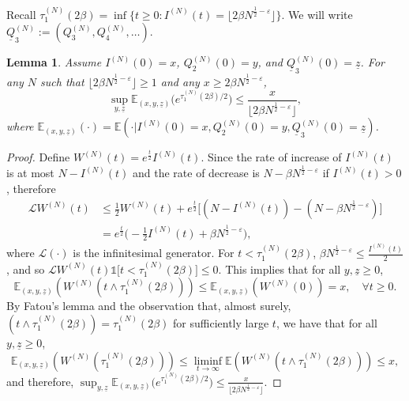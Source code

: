 \documentclass[11pt, reqno]{article}
\newtheorem{lemma}[theorem]{Lemma}
\numberwithin{equation}{section}
\numberwithin{theorem}{section}
\begin{document}
Recall $\tau^{(N)}_1(2\beta)=\inf \{t\geq 0: I^{(N)}(t)= \lfloor 2\beta N^{\frac{1}{2}-\varepsilon}\rfloor\}$. We will write $\underline{Q}^{(N)}_3 := (Q_3^{(N)}, Q_4^{(N)}, \dots)$.

\begin{lemma}\label{lem:LEMMA-9}
Assume $I^{(N)}(0)=x$, $Q^{(N)}_2(0)=y$, and $\underline{Q}^{(N)}_3(0)=\underline{z}$. For any $N$ such that $\lfloor 2\beta N^{\frac{1}{2}-\varepsilon}\rfloor \ge 1$ and any $x\geq 2\beta N^{\frac{1}{2}-\varepsilon}$,
\begin{equation*}
    \sup_{y,\underline{z}}\mathbb{E}_{(x,y,\underline{z})}\big(e^{\tau^{(N)}_1(2\beta)/2}\big)\leq \frac{x}{\lfloor 2\beta N^{\frac{1}{2}-\varepsilon}\rfloor},
\end{equation*}
where $\mathbb{E}_{(x,y,\underline{z})}(\cdot)=\mathbb{E}(\cdot|I^{(N)}(0)=x,Q^{(N)}_2(0)=y,\underline{Q}^{(N)}_3(0)=\underline{z})$.
\end{lemma}
\begin{proof}
Define $W^{(N)}(t)=e^{\frac{t}{2}}I^{(N)}(t)$. 
Since the rate of increase of $I^{(N)}(t)$ is at most $N-I^{(N)}(t)$ and the rate of decrease is $N-\beta N^{\frac{1}{2}-\varepsilon}$ if $I^{(N)}(t)>0$, therefore
\begin{align*}
    \mathcal{L}W^{(N)}(t)&\leq \frac{1}{2}W^{(N)}(t)+e^{\frac{t}{2}}\big[(N-I^{(N)}(t))-(N-\beta N^{\frac{1}{2}-\varepsilon})\big]\\
    &=e^{\frac{t}{2}}\big(-\frac{1}{2} I^{(N)}(t)+\beta N^{\frac{1}{2}-\varepsilon}\big),
\end{align*}
where $\mathcal{L}(\cdot)$ is the infinitesimal generator.
For $t < \tau^{(N)}_1(2\beta)$, $\beta N^{\frac{1}{2}-\varepsilon}\leq \frac{I^{(N)}(t)}{2}$, and so $\mathcal{L}W^{(N)}(t)\mathds{1}\big[t < \tau^{(N)}_1(2\beta)\big]\leq 0.$
This implies that for all $y,\underline{z}\geq0$,
\begin{equation*}
\mathbb{E}_{(x,y,\underline{z})}(W^{(N)}(t\wedge \tau^{(N)}_1(2\beta)))\leq \mathbb{E}_{(x,y,\underline{z})}(W^{(N)}(0))=x,\quad\forall t\geq 0.
\end{equation*}
By Fatou's lemma and the observation that, almost surely, $(t\wedge \tau^{(N)}_1(2\beta))=\tau^{(N)}_1(2\beta)$ for sufficiently large $t$, we have that for all $y,\underline{z}\geq0$, 
\begin{equation}
    \mathbb{E}_{(x,y,\underline{z})}(W^{(N)}(\tau^{(N)}_1(2\beta)))\leq \liminf_{t\rightarrow\infty}\mathbb{E}(W^{(N)}(t\wedge \tau^{(N)}_1(2\beta)))\leq x,
\end{equation} 
and therefore, 
$ \sup_{y,\underline{z}}\mathbb{E}_{(x,y,\underline{z})}\big(e^{\tau^{(N)}_1(2\beta)/2}\big)\leq \frac{x}{\lfloor 2\beta N^{\frac{1}{2}-\varepsilon}\rfloor}.$
\end{proof}
\end{document}
